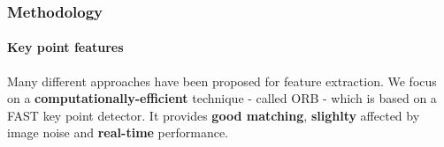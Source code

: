 \begin{frame}
	\frametitle{Methodology}
	\framesubtitle{Key point features}
	
	\Large
	
	\vspace{0.7cm}
	
	Many different approaches have been proposed for feature extraction. We focus on a
	\textbf{computationally-efficient} technique - called ORB - which is based on a FAST key point
	detector. It provides \textbf{good matching}, \textbf{slighlty} affected by image noise and
	\textbf{real-time} performance.
	
	\vspace{0.1cm}
	
	\begin{center}
	\end{center}
\end{frame}

